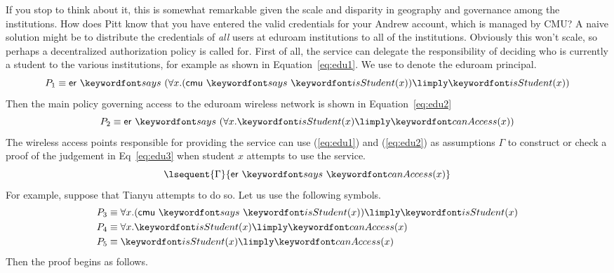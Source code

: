 \documentclass[11pt,twoside]{scrartcl}
\begin{document}
If you stop to think about it, this is somewhat remarkable given the scale and disparity in geography and governance among the institutions. How does Pitt know that you have entered the valid credentials for your Andrew account, which is managed by CMU? A naive solution might be to distribute the credentials of \emph{all} users at eduroam institutions to all of the institutions. Obviously this won't scale, so perhaps a decentralized authorization policy is called for. First of all, the service \eduroam can delegate the responsibility of deciding who is currently a student to the various institutions, for example as shown in Equation~\ref{eq:edu1}. We use \eduroam to denote the eduroam principal.
\begin{equation}
\label{eq:edu1}
P_1 \equiv \says{\eduroam}{(\forall x.(\says{\cmu}{\isstu(x)}) \limply \isstu(x))}
\end{equation}
Then the main policy governing access to the eduroam wireless network is shown in Equation~\ref{eq:edu2}
\begin{equation}
\label{eq:edu2}
P_2 \equiv \says{\eduroam}{(\forall x.\isstu(x) \limply \canacc(x))}
\end{equation}
The wireless access points responsible for providing the service can use (\ref{eq:edu1}) and (\ref{eq:edu2}) as assumptions $\Gamma$ to construct or check a proof of the judgement in Eq~\ref{eq:edu3} when student $x$ attempts to use the service.
\begin{equation}
\label{eq:edu3}
\lsequent{\Gamma}{\says{\eduroam}{\canacc(x)}}
\end{equation}
For example, suppose that Tianyu attempts to do so. Let us use the following symbols.
\begin{align*}
P_3 &\equiv \forall x.(\says{\cmu}{\isstu(x)}) \limply \isstu(x) \\
P_4 &\equiv \forall x.\isstu(x) \limply \canacc(x) \\
P_5 &\equiv \isstu(x) \limply \canacc(x)
\end{align*}
Then the proof begins as follows.
\begin{sequentdeduction}[array]
\end{sequentdeduction}
\end{document}
